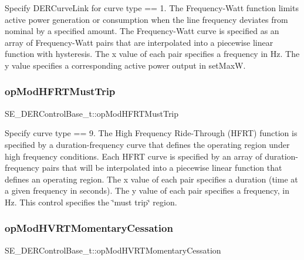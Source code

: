 Specify D\+E\+R\+Curve\+Link for curve type == 1. The Frequency-\/\+Watt function limits active power generation or consumption when the line frequency deviates from nominal by a specified amount. The Frequency-\/\+Watt curve is specified as an array of Frequency-\/\+Watt pairs that are interpolated into a piecewise linear function with hysteresis. The x value of each pair specifies a frequency in Hz. The y value specifies a corresponding active power output in set\+MaxW. \mbox{\label{group__DERControlBase_gaef9f47c883d5d5396d782f0302bf77b7}} 
\subsubsection{\texorpdfstring{op\+Mod\+H\+F\+R\+T\+Must\+Trip}{opModHFRTMustTrip}}
{\footnotesize\ttfamily S\+E\+\_\+\+D\+E\+R\+Control\+Base\+\_\+t\+::op\+Mod\+H\+F\+R\+T\+Must\+Trip}

Specify curve type == 9. The High Frequency Ride-\/\+Through (H\+F\+RT) function is specified by a duration-\/frequency curve that defines the operating region under high frequency conditions. Each H\+F\+RT curve is specified by an array of duration-\/frequency pairs that will be interpolated into a piecewise linear function that defines an operating region. The x value of each pair specifies a duration (time at a given frequency in seconds). The y value of each pair specifies a frequency, in Hz. This control specifies the \char`\"{}must trip\char`\"{} region. \mbox{\label{group__DERControlBase_gafe0a7951692bbd4f45dfb6c59a621b0c}} 
\subsubsection{\texorpdfstring{op\+Mod\+H\+V\+R\+T\+Momentary\+Cessation}{opModHVRTMomentaryCessation}}
{\footnotesize\ttfamily S\+E\+\_\+\+D\+E\+R\+Control\+Base\+\_\+t\+::op\+Mod\+H\+V\+R\+T\+Momentary\+Cessation}

